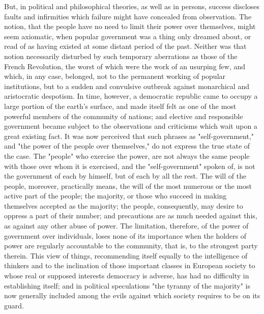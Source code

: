 \documentclass[12pt]{report}
\begin{document}
But, in political and philosophical theories, as well as in persons, success discloses faults and infirmities which failure might have concealed from observation. The notion, that the people have no need to limit their power over themselves, might seem axiomatic, when popular government was a thing only dreamed about, or read of as having existed at some distant period of the past. Neither was that notion necessarily disturbed by such temporary aberrations as those of the French Revolution, the worst of which were the work of an usurping few, and which, in any case, belonged, not to the permanent working of popular institutions, but to a sudden and convulsive outbreak against monarchical and aristocratic despotism. In time, however, a democratic republic came to occupy a large portion of the earth's surface, and made itself felt as one of the most powerful members of the community of nations; and elective and responsible government became subject to the observations and criticisms which wait upon a great existing fact. It was now perceived that such phrases as "self-government," and "the power of the people over themselves," do not express the true state of the case. The "people" who exercise the power, are not always the same people with those over whom it is exercised, and the "self-government" spoken of, is not the government of each by himself, but of each by all the rest. The will of the people, moreover, practically means, the will of the most numerous or the most active part of the people; the majority, or those who succeed in making themselves accepted as the majority; the people, consequently, may desire to oppress a part of their number; and precautions are as much needed against this, as against any other abuse of power. The limitation, therefore, of the power of government over individuals, loses none of its importance when the holders of power are regularly accountable to the community, that is, to the strongest party therein. This view of things, recommending itself equally to the intelligence of thinkers and to the inclination of those important classes in European society to whose real or supposed interests democracy is adverse, has had no difficulty in establishing itself; and in political speculations "the tyranny of the majority" is now generally included among the evils against which society requires to be on its guard.
\end{document}
